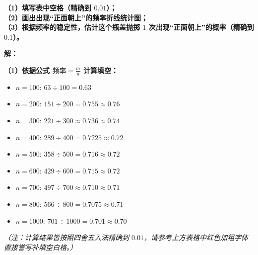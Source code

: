\vspace{0.3cm}
\begin{center}
\renewcommand{\arraystretch}{1.8}
\end{center}

\vspace{0.4cm}
\textbf{（1）填写表中空格（精确到 $0.01$）；\\
（2）画出出现“正面朝上”的频率折线统计图；\\
（3）根据频率的稳定性，估计这个瓶盖抛掷 $1$ 次出现“正面朝上”的概率（精确到 $0.1$）。}

\vspace{0.4cm}
\textbf{解：}

\textbf{（1）依据公式 $\text{频率} = \frac{m}{n}$ 计算填空：}
\begin{itemize}
    \item $n=100$: $63 \div 100 = 0.63$
    \item $n=200$: $151 \div 200 = 0.755 \approx 0.76$
    \item $n=300$: $221 \div 300 \approx 0.736 \approx 0.74$
    \item $n=400$: $289 \div 400 = 0.7225 \approx 0.72$
    \item $n=500$: $358 \div 500 = 0.716 \approx 0.72$
    \item $n=600$: $429 \div 600 = 0.715 \approx 0.72$
    \item $n=700$: $497 \div 700 \approx 0.710 \approx 0.71$
    \item $n=800$: $566 \div 800 = 0.7075 \approx 0.71$
    \item $n=1000$: $701 \div 1000 = 0.701 \approx 0.70$
\end{itemize}
\textit{（注：计算结果皆按照四舍五入法精确到 $0.01$，请参考上方表格中红色加粗字体直接誉写补填空白格。）}

